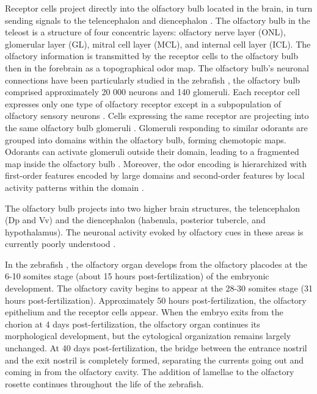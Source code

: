     Receptor cells project directly into the olfactory bulb located in the brain, in turn sending signals to the telencephalon and diencephalon \cite{miyasaka2009olfactory}. The olfactory bulb in the teleost is a structure of four concentric layers: olfactory nerve layer (ONL), glomerular layer (GL), mitral cell layer (MCL), and internal cell layer (ICL). The olfactory information is transmitted by the receptor cells to the olfactory bulb \cite{nikonov2001electrophysiological} then in the forebrain \cite{nikonov2005beyond} as a topographical odor map. The olfactory bulb's neuronal connections have been particularly studied in the zebrafish \cite{hansen1998peripheral,kermen2013neural}, the olfactory bulb comprised approximately 20 000 neurons \cite{friedrich2009processing} and 140 glomeruli\cite{braubach2012distribution}. Each receptor cell expresses only one type of olfactory receptor \cite{serizawa2004one,barth1997noncoordinate,weth1996nested,sato2007hierarchical} except in a subpopulation of olfactory sensory neurons \cite{sato2007hierarchical}. Cells expressing the same receptor are projecting into the same olfactory bulb glomeruli \cite{sato2005mutually}. Glomeruli responding to similar odorants are grouped into domains within the olfactory bulb, forming chemotopic maps. Odorants can activate glomeruli outside their domain, leading to a fragmented map inside the olfactory bulb \cite{friedrich1998chemotopic}. Moreover, the odor encoding is hierarchized with first-order features encoded by large domains and second-order features by local activity patterns within the domain \cite{fuss2001odorant,korsching2001odor}.

    The olfactory bulb projects into two higher brain structures, the telencephalon (Dp and Vv) and the diencephalon (habenula, posterior tubercle, and hypothalamus). The neuronal activity evoked by olfactory cues in these areas is currently poorly understood \cite{kermen2013neural}.

    In the zebrafish \cite{hansen1993development,miyasaka2013functional}, the olfactory organ develops from the olfactory placodes at the 6-10 somites stage (about 15 hours post-fertilization) of the embryonic development. The olfactory cavity begins to appear at the 28-30 somites stage (31 hours post-fertilization). Approximately 50 hours post-fertilization, the olfactory epithelium and the receptor cells appear. When the embryo exits from the chorion at 4 days post-fertilization, the olfactory organ continues its morphological development, but the cytological organization remains largely unchanged. At 40 days post-fertilization, the bridge between the entrance nostril and the exit nostril is completely formed, separating the currents going out and coming in from the olfactory cavity. The addition of lamellae to the olfactory rosette continues throughout the life of the zebrafish.

